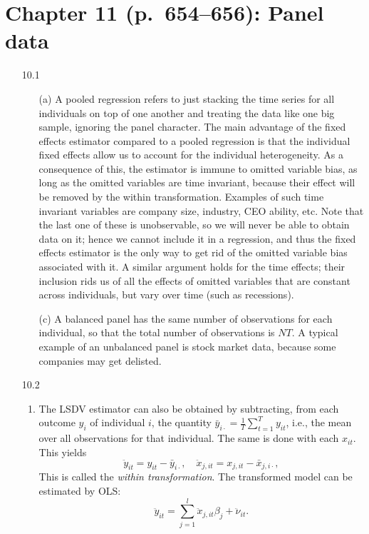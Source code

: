 \documentclass[11pt,a4paper]{article}
\begin{document}
\section*{Chapter 11 (p.\ 654--656): Panel data}
 \begin{enumerate}
\item[10.1]
\begin{enumerate}
             \item[(a)]  A pooled regression refers to just stacking the time series for all individuals on top of one another and treating the data like one big sample, ignoring the panel character. The main advantage of the fixed effects estimator compared to a pooled regression is that the individual fixed effects allow us to account for the individual heterogeneity. As a consequence of this, the estimator is immune to omitted variable bias, as long as the omitted variables are time invariant, because their effect will be removed by the within transformation. Examples of such time invariant variables are company size, industry, CEO ability, etc. Note that the last one of these is unobservable, so we will never be able to obtain data on it; hence we cannot include it in a regression, and thus the fixed effects estimator is the only way to get rid of the omitted variable bias associated with it. A similar argument holds for the time effects; their inclusion rids us of all the effects of omitted variables that are constant across individuals, but vary over time (such as recessions).
                 \item[(c)] A balanced panel has the same number of observations for each individual, so that the total number of observations is $NT$. A typical example of an unbalanced panel is stock market data, because some companies may get delisted.
\end{enumerate}
\item[10.2]
\begin{enumerate}
   \item  The LSDV estimator can also be obtained by subtracting, from each outcome $y_i$ of individual $i$, the quantity $\bar y_{i \cdot}=\frac{1}{T}\sum_{t=1}^{T}y_{it}$, i.e., the mean over all observations for that individual. The same is done with each $x_{it}$. This yields
                                          \[
\ddot y_{it}=y_{it}-\bar y_{i\cdot}, \quad \ddot
x_{j,it}=x_{j,it}-\bar x_{j,i\cdot},
\]
This is called the \emph{within transformation}. The transformed model can be estimated by
OLS:
\[
\ddot y_{it}=\sum_{j=1}^l\ddot{x}_{j,it}\beta_j+\ddot
\nu_{it}.
\]

\end{enumerate}
\end{enumerate}
\end{document}
